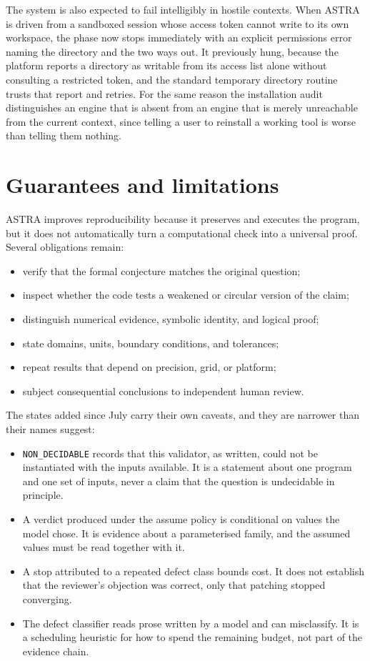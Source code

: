 \documentclass[11pt,a4paper]{article}
\begin{document}
The system is also expected to fail intelligibly in hostile contexts. When ASTRA is driven from a sandboxed session whose access token cannot write to its own workspace, the phase now stops immediately with an explicit permissions error naming the directory and the two ways out. It previously hung, because the platform reports a directory as writable from its access list alone without consulting a restricted token, and the standard temporary directory routine trusts that report and retries. For the same reason the installation audit distinguishes an engine that is absent from an engine that is merely unreachable from the current context, since telling a user to reinstall a working tool is worse than telling them nothing.

\section{Guarantees and limitations}

ASTRA improves reproducibility because it preserves and executes the program, but it does not automatically turn a computational check into a universal proof. Several obligations remain:

\begin{itemize}
  \item verify that the formal conjecture matches the original question;
  \item inspect whether the code tests a weakened or circular version of the claim;
  \item distinguish numerical evidence, symbolic identity, and logical proof;
  \item state domains, units, boundary conditions, and tolerances;
  \item repeat results that depend on precision, grid, or platform;
  \item subject consequential conclusions to independent human review.
\end{itemize}

The states added since July carry their own caveats, and they are narrower than their names suggest:

\begin{itemize}
  \item \texttt{NON\_DECIDABLE} records that this validator, as written, could not be instantiated with the inputs available. It is a statement about one program and one set of inputs, never a claim that the question is undecidable in principle.
  \item A verdict produced under the assume policy is conditional on values the model chose. It is evidence about a parameterised family, and the assumed values must be read together with it.
  \item A stop attributed to a repeated defect class bounds cost. It does not establish that the reviewer's objection was correct, only that patching stopped converging.
  \item The defect classifier reads prose written by a model and can misclassify. It is a scheduling heuristic for how to spend the remaining budget, not part of the evidence chain.
\end{itemize}
\end{document}
